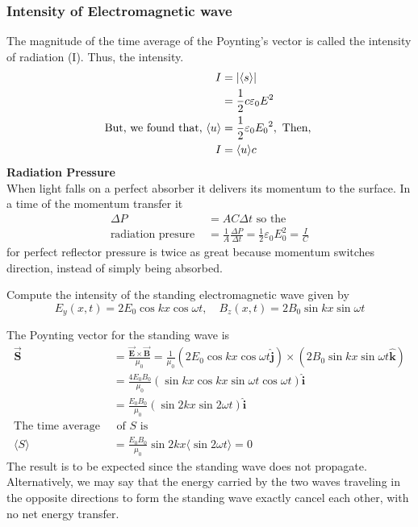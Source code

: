 \subsubsection{Intensity of Electromagnetic wave}
The magnitude of the time average of the Poynting's vector is called the intensity of radiation (I). Thus, the intensity.
\begin{align*}
I&=|\langle {s}\rangle|\\&=\frac{1}{2}c \varepsilon_{0}  E^2\\
\text{But, we found that, $ \langle u\rangle$}&=\frac{1}{2}\varepsilon_{0} {E_0}^{2},\text{ Then, }\\
I&=\langle u\rangle c
\end{align*}
\textbf{Radiation Pressure}\\
When light falls on a perfect absorber it delivers its momentum to the surface. In a time of the momentum transfer it
\begin{align*}
\Delta P&=AC \Delta t\text{ so the}\\
\text{radiation presure }&=\frac{1}{A} \frac{\Delta P}{\Delta t}=\frac{1}{2}\varepsilon_{0} E_0^2=\frac{I}{C}
\end{align*}
for perfect reflector pressure is twice as great because momentum switches direction, instead of simply being absorbed.
\begin{exercise}
	Compute the intensity of the standing electromagnetic wave given by
	$$
	E_{y}(x, t)=2 E_{0} \cos k x \cos \omega t, \quad B_{z}(x, t)=2 B_{0} \sin k x \sin \omega t
	$$
\end{exercise}
\begin{answer}
	The Poynting vector for the standing wave is
	\begin{align*}
	\overrightarrow{\mathbf{S}} &=\frac{\overrightarrow{\mathbf{E}} \times \overrightarrow{\mathbf{B}}}{\mu_{0}}=\frac{1}{\mu_{0}}\left(2 E_{0} \cos k x \cos \omega t \hat{\mathbf{j}}\right) \times\left(2 B_{0} \sin k x \sin \omega t \hat{\mathbf{k}}\right) \\
	&=\frac{4 E_{0} B_{0}}{\mu_{0}}(\sin k x \cos k x \sin \omega t \cos \omega t) \hat{\mathbf{i}} \\
	&=\frac{E_{0} B_{0}}{\mu_{0}}(\sin 2 k x \sin 2 \omega t) \hat{\mathbf{i}}\\
	\text{The time average }&\text{ of $S$ is}\\
	\langle S\rangle&=\frac{E_{0} B_{0}}{\mu_{0}} \sin 2 k x\langle\sin 2 \omega t\rangle=0
	\end{align*}
	The result is to be expected since the standing wave does not propagate. Alternatively, we may say that the energy carried by the two waves traveling in the opposite directions to form the standing wave exactly cancel each other, with no net energy transfer.
\end{answer}
